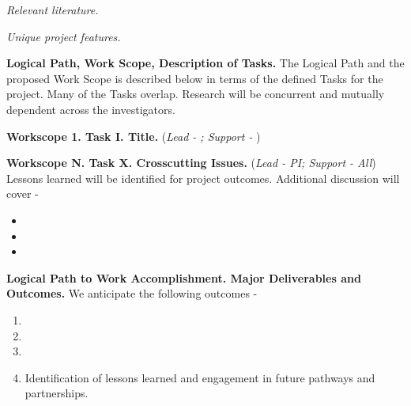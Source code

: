 \documentclass[11pt,letterpaper]{article}
\begin{document}
\textit{Relevant literature.} 

\textit{Unique project features.} 

\vspace{0.5\baselineskip}


\noindent\textbf{Logical Path, Work Scope, Description of Tasks.} The Logical Path and the proposed Work Scope is described below in terms of the defined Tasks for the project. Many of the Tasks overlap. Research will be concurrent and mutually dependent across the investigators.

\vspace{0.25\baselineskip}

\noindent\textbf{Workscope 1. Task I. Title.} (\textit{Lead - ; Support - }) 

\vspace{0.25\baselineskip}

\noindent\textbf{Workscope N. Task X. Crosscutting Issues.} (\textit{Lead - PI; Support - All}) Lessons learned will be identified for project outcomes. Additional discussion will cover -
\begin{itemize}[topsep=0pt,itemsep=-1ex,partopsep=1ex,parsep=1ex]
    \item
    \item
    \item
\end{itemize}

\vspace{0.5\baselineskip}

\noindent\textbf{Logical Path to Work Accomplishment. Major Deliverables and Outcomes.} We anticipate the following outcomes -
\begin{enumerate}[topsep=0pt,itemsep=-1ex,partopsep=1ex,parsep=1ex]
    \item
    \item
    \item
    \item Identification of lessons learned and engagement in future pathways and partnerships.
\end{enumerate}

\vspace{0.5\baselineskip}
\end{document}
